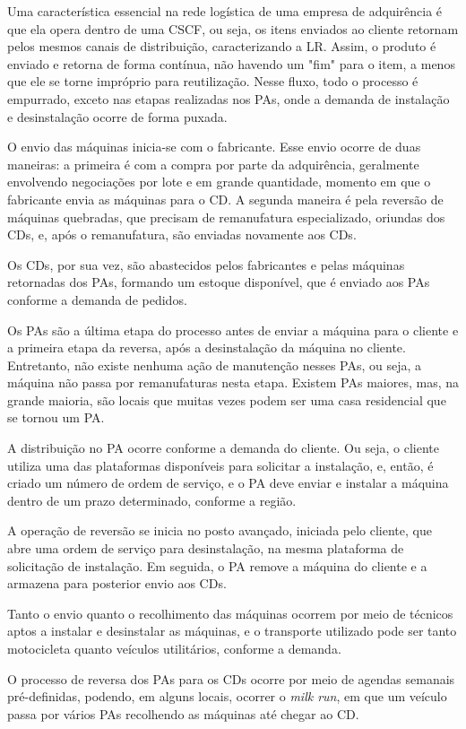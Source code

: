 Uma característica essencial na rede logística de uma empresa de adquirência é que ela opera dentro de uma CSCF, ou seja, os itens enviados ao cliente retornam pelos mesmos canais de distribuição, caracterizando a LR. Assim, o produto é enviado e retorna de forma contínua, não havendo um "fim" para o item, a menos que ele se torne impróprio para reutilização. Nesse fluxo, todo o processo é empurrado, exceto nas etapas realizadas nos PAs, onde a demanda de instalação e desinstalação ocorre de forma puxada.

O envio das máquinas inicia-se com o fabricante. Esse envio ocorre de duas maneiras: a primeira é com a compra por parte da adquirência, geralmente envolvendo negociações por lote e em grande quantidade, momento em que o fabricante envia as máquinas para o CD. A segunda maneira é pela reversão de máquinas quebradas, que precisam de remanufatura especializado, oriundas dos CDs, e, após o remanufatura, são enviadas novamente aos CDs.

Os CDs, por sua vez, são abastecidos pelos fabricantes e pelas máquinas retornadas dos PAs, formando um estoque disponível, que é enviado aos PAs conforme a demanda de pedidos.

Os PAs são a última etapa do processo antes de enviar a máquina para o cliente e a primeira etapa da reversa, após a desinstalação da máquina no cliente. Entretanto, não existe nenhuma ação de manutenção nesses PAs, ou seja, a máquina não passa por remanufaturas nesta etapa. Existem PAs maiores, mas, na grande maioria, são locais que muitas vezes podem ser uma casa residencial que se tornou um PA.

A distribuição no PA ocorre conforme a demanda do cliente. Ou seja, o cliente utiliza uma das plataformas disponíveis para solicitar a instalação, e, então, é criado um número de ordem de serviço, e o PA deve enviar e instalar a máquina dentro de um prazo determinado, conforme a região.

A operação de reversão se inicia no posto avançado, iniciada pelo cliente, que abre uma ordem de serviço para desinstalação, na mesma plataforma de solicitação de instalação. Em seguida, o PA remove a máquina do cliente e a armazena para posterior envio aos CDs.

Tanto o envio quanto o recolhimento das máquinas ocorrem por meio de técnicos aptos a instalar e desinstalar as máquinas, e o transporte utilizado pode ser tanto motocicleta quanto veículos utilitários, conforme a demanda.

O processo de reversa dos PAs para os CDs ocorre por meio de agendas semanais pré-definidas, podendo, em alguns locais, ocorrer o \emph{milk run}, em que um veículo passa por vários PAs recolhendo as máquinas até chegar ao CD.

